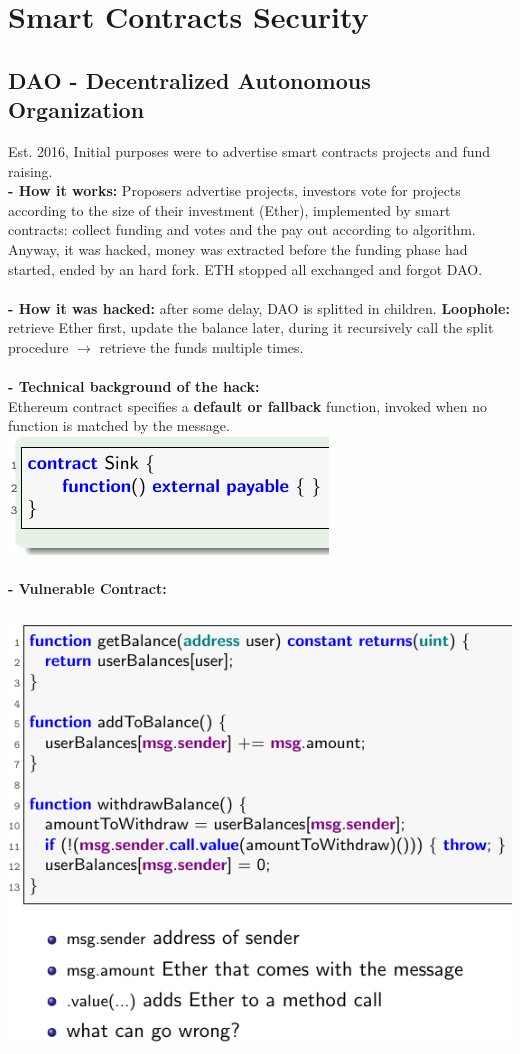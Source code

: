 \documentclass{article}
\begin{document}
\newpage
\section{Smart Contracts Security}
\subsection{DAO - Decentralized Autonomous Organization}
Est. 2016, Initial purposes were to advertise smart contracts projects and fund raising.\\
\textbf{- How it works: }Proposers advertise projects, investors vote for projects according to the size of their investment (Ether), implemented by smart contracts: collect funding and votes and the pay out according to algorithm.\\
Anyway, it was hacked, money was extracted before the funding phase had started, ended by an hard fork. ETH stopped all exchanged and forgot DAO.\\\\
\textbf{- How it was hacked: }after some delay, DAO is splitted in children. \textbf{Loophole:} retrieve Ether first, update the balance later, during it recursively call the split procedure $\rightarrow$ retrieve the funds multiple times.\\\\
\textbf{- Technical background of the hack: }\\
Ethereum contract specifies a \textbf{default or fallback} function, invoked when no function is matched by the message. \\
\includegraphics[scale=0.3]{86.png}\\\\
\textbf{- Vulnerable Contract:}\\\\
\includegraphics[scale=0.3]{87.png}\\\\
\end{document}
